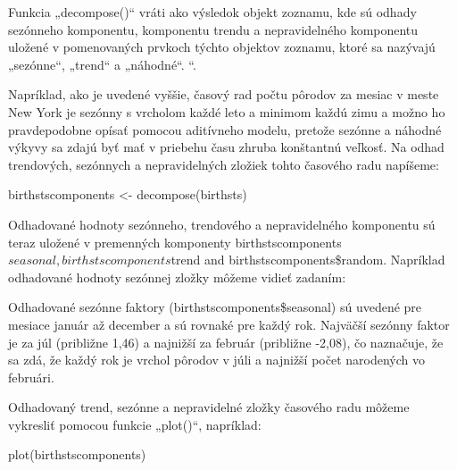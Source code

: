 \documentclass[
  letterpaper,
  DIV=11,
  numbers=noendperiod]{scrreprt}
\newenvironment{Shaded}{\begin{snugshade}}{\end{snugshade}}
\newcommand{\CommentTok}[1]{\textcolor[rgb]{0.37,0.37,0.37}{#1}}
\newcommand{\FunctionTok}[1]{\textcolor[rgb]{0.28,0.35,0.67}{#1}}
\newcommand{\NormalTok}[1]{\textcolor[rgb]{0.00,0.23,0.31}{#1}}
\newcommand{\OtherTok}[1]{\textcolor[rgb]{0.00,0.23,0.31}{#1}}
\begin{document}
Funkcia „decompose()`` vráti ako výsledok objekt zoznamu, kde sú odhady
sezónneho komponentu, komponentu trendu a nepravidelného komponentu
uložené v pomenovaných prvkoch týchto objektov zoznamu, ktoré sa
nazývajú „sezónne``, „trend`` a „náhodné``. ``.

Napríklad, ako je uvedené vyššie, časový rad počtu pôrodov za mesiac v
meste New York je sezónny s vrcholom každé leto a minimom každú zimu a
možno ho pravdepodobne opísať pomocou aditívneho modelu, pretože sezónne
a náhodné výkyvy sa zdajú byť mať v priebehu času zhruba konštantnú
veľkosť. Na odhad trendových, sezónnych a nepravidelných zložiek tohto
časového radu napíšeme:

\begin{Shaded}
\begin{Highlighting}[]
\NormalTok{birthstscomponents }\OtherTok{\textless{}{-}} \FunctionTok{decompose}\NormalTok{(birthsts)}
\end{Highlighting}
\end{Shaded}

Odhadované hodnoty sezónneho, trendového a nepravidelného komponentu sú
teraz uložené v premenných komponenty
birthstscomponents\(seasonal, birthstscomponents\)trend and
birthstscomponents\$random. Napríklad odhadované hodnoty sezónnej zložky
môžeme vidieť zadaním:

\begin{Shaded}
\end{Shaded}

Odhadované sezónne faktory (birthstscomponents\$seasonal) sú uvedené pre
mesiace január až december a sú rovnaké pre každý rok. Najväčší sezónny
faktor je za júl (približne 1,46) a najnižší za február (približne
-2,08), čo naznačuje, že sa zdá, že každý rok je vrchol pôrodov v júli a
najnižší počet narodených vo februári.

\begin{Shaded}
\end{Shaded}

Odhadovaný trend, sezónne a nepravidelné zložky časového radu môžeme
vykresliť pomocou funkcie „plot()``, napríklad:

\begin{Shaded}
\begin{Highlighting}[]
\FunctionTok{plot}\NormalTok{(birthstscomponents)}
\end{Highlighting}
\end{Shaded}
\end{document}
